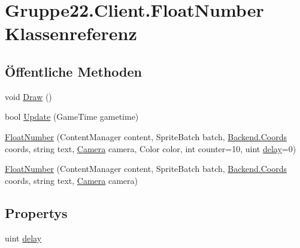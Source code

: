 \hypertarget{class_gruppe22_1_1_client_1_1_float_number}{\section{Gruppe22.\-Client.\-Float\-Number Klassenreferenz}
\label{class_gruppe22_1_1_client_1_1_float_number}
}
\subsection*{Öffentliche Methoden}
\begin{DoxyCompactItemize}
\item 
void \hyperlink{class_gruppe22_1_1_client_1_1_float_number_aac25fa8a3ace459211a9e2f5fe6e553d}{Draw} ()
\item 
bool \hyperlink{class_gruppe22_1_1_client_1_1_float_number_a09188feffb25fcfc7aab55ad04e90463}{Update} (Game\-Time gametime)
\item 
\hyperlink{class_gruppe22_1_1_client_1_1_float_number_a7d94ecc2b6192c12272c3587b1e72aaf}{Float\-Number} (Content\-Manager content, Sprite\-Batch batch, \hyperlink{class_gruppe22_1_1_backend_1_1_coords}{Backend.\-Coords} coords, string text, \hyperlink{class_gruppe22_1_1_client_1_1_camera}{Camera} camera, Color color, int counter=10, uint \hyperlink{class_gruppe22_1_1_client_1_1_float_number_a631929f5625e5c39b4924da3f57b684f}{delay}=0)
\item 
\hyperlink{class_gruppe22_1_1_client_1_1_float_number_a1e2b224422c410ec2b94ea5b3f9c26fe}{Float\-Number} (Content\-Manager content, Sprite\-Batch batch, \hyperlink{class_gruppe22_1_1_backend_1_1_coords}{Backend.\-Coords} coords, string text, \hyperlink{class_gruppe22_1_1_client_1_1_camera}{Camera} camera)
\end{DoxyCompactItemize}
\subsection*{Propertys}
\begin{DoxyCompactItemize}
\item 
uint \hyperlink{class_gruppe22_1_1_client_1_1_float_number_a631929f5625e5c39b4924da3f57b684f}{delay}
\end{DoxyCompactItemize}


